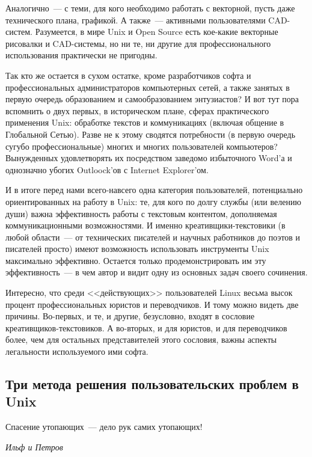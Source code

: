 Аналогично~--- с теми, для кого необходимо работать с векторной, пусть даже технического плана, графикой. А также~--- активными пользователями CAD-систем. Разумеется, в мире Unix и Open Source есть кое-какие векторные рисовалки и CAD-системы, но ни те, ни другие для профессионального использования практически не пригодны.

Так кто же остается в сухом остатке, кроме разработчиков софта и профессиональных администраторов компьютерных сетей, а также занятых в первую очередь образованием и самообразованием энтузиастов? И вот тут пора вспомнить о двух первых, в историческом плане, сферах практического применения Unix: обработке текстов и коммуникациях (включая общение в Глобальной Сетью). Разве не к этому сводятся потребности (в первую очередь сугубо профессиональные) многих и многих пользователей компьютеров? Вынужденных удовлетворять их посредством заведомо избыточного Word'а и однозначно убогих Outloock'ов с Internet Explorer'ом.

И в итоге перед нами всего-навсего одна категория пользователей, потенциально ориентированных на работу в Unix: те, для кого по долгу службы (или велению души) важна эффективность работы с текстовым контентом, дополняемая коммуникационными возможностями. И именно креативщики-текстовики (в любой области~--- от технических писателей и научных работников до поэтов и писателей просто) имеют возможность использовать инструменты Unix максимально эффективно. Остается только продемонстрировать им эту эффективность~--- в чем автор и видит одну из основных задач своего сочинения.

Интересно, что среди <<действующих>> пользователей Linux весьма высок процент профессиональных юристов и переводчиков. И тому можно видеть две причины. Во-первых, и те, и другие, безусловно, входят в сословие креативщиков-текстовиков. А во-вторых, и для юристов, и для переводчиков более, чем для остальных представителей этого сословия, важны аспекты легальности используемого ими софта.

\subsection{Три метода решения пользовательских проблем в Unix}

\hfill \begin{minipage}[h]{0.45\textwidth}
Спасение утопающих~--- дело рук самих утопающих!
\begin{flushright}
\textit{Ильф и Петров}
\end{flushright}
\bigskip\end{minipage}

